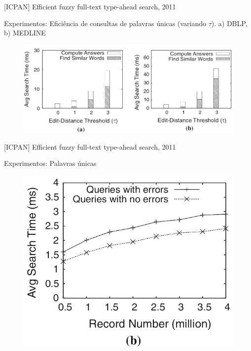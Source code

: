 \documentclass[11pt]{beamer}
\begin{document}
\begin{frame}{[ICPAN] Efficient fuzzy full-text type-ahead search, 2011}
    
    Experimentos: Eficiência de consultas de palavras únicas (variando $\tau$). a) DBLP, b) MEDLINE

    \begin{figure}
      \includegraphics[scale=0.33]{pictures/icpan_8_ex.png}
      \centering
    \end{figure}
    
\end{frame}

\begin{frame}{[ICPAN] Efficient fuzzy full-text type-ahead search, 2011}
    
    Experimentos: Palavras únicas

    \begin{figure}
      \includegraphics[scale=0.35]{pictures/icpan_9_ex.png}
      \centering
    \end{figure}
    
\end{frame}
\end{document}
